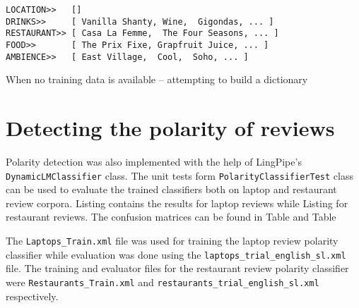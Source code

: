 \begin{listing}
\begin{verbatim}
LOCATION>>   []
DRINKS>>     [ Vanilla Shanty, Wine,  Gigondas, ... ]
RESTAURANT>> [ Casa La Femme,  The Four Seasons, ... ]
FOOD>>       [ The Prix Fixe, Grapfruit Juice, ... ]
AMBIENCE>>   [ East Village,  Cool,  Soho, ... ]
\end{verbatim}
\caption{When no training data is available -- attempting to build a
dictionary}
\label{listing:builtDictionary}
\end{listing}

\section*{Detecting the polarity of reviews}
Polarity detection was also implemented with the help of LingPipe's
\verb|DynamicLMClassifier| class. The unit tests form
\verb|PolarityClassifierTest| class can be used to evaluate the trained
classifiers both on laptop and restaurant review corpora. Listing
 contains the results for laptop reviews while
Listing  for restaurant reviews. The confusion
matrices can be found in Table  and Table

The \texttt{Laptops\_Train.xml} file was used for training the laptop
review polarity classifier while evaluation was done using the
\texttt{laptops\_trial\_english\_sl.xml} file. The training and evaluator files
for the restaurant review polarity classifier were
\texttt{Restaurants\_Train.xml} and \texttt{restaurants\_trial\_english\_sl.xml}
respectively.

